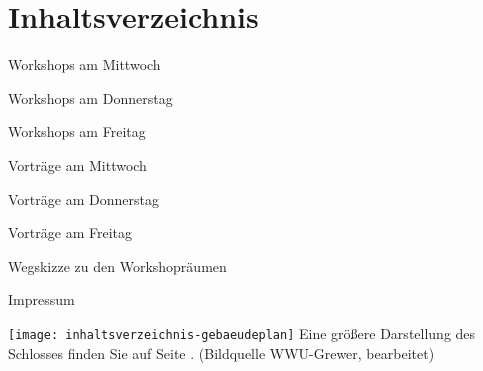 \section*{Inhaltsverzeichnis}

\vspace*{0.35em}%
\noindent Workshops am Mittwoch \dotfill \pageref{mittwoch-workshops}

\vspace*{0.35em}%
\noindent Workshops am Donnerstag \dotfill \pageref{donnerstag-workshops}

\vspace*{0.35em}%
\noindent Workshops am Freitag \dotfill \pageref{freitag-workshops}

\vspace*{0.35em}%
\noindent Vorträge am Mittwoch \dotfill \pageref{mittwoch}

\vspace*{0.35em}%
\noindent Vorträge am Donnerstag \dotfill \pageref{donnerstag}

\vspace*{0.35em}%
\noindent Vorträge am Freitag \dotfill \pageref{freitag}

\vspace*{0.35em}%
\noindent Wegskizze zu den Workshopräumen \dotfill \pageref{karte}

\vspace*{0.35em}%
\noindent Impressum \dotfill \pageref{impressum}\\

\begin{center}
	\texttt{[image: inhaltsverzeichnis-gebaeudeplan]}
\noindent Eine größere Darstellung des Schlosses finden Sie auf Seite \pageref{gebaeudeplan}.
(Bildquelle WWU-Grewer, bearbeitet)
\end{center}